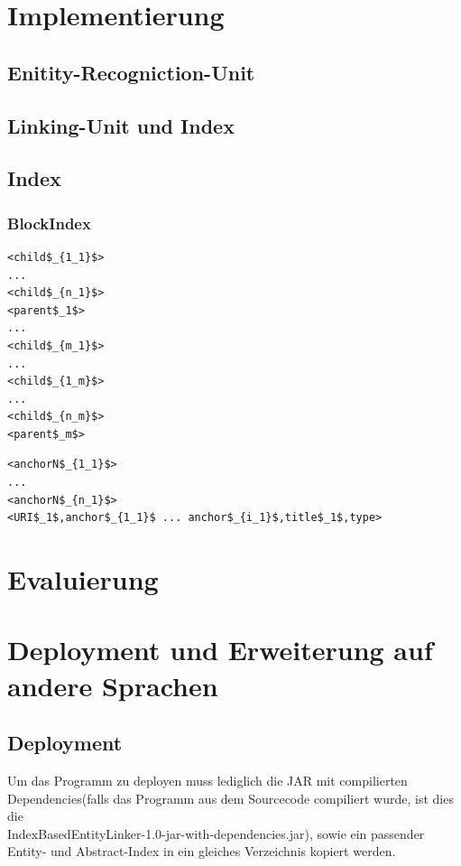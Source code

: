 \documentclass[11pt, a4paper, oneside]{Thesis} %
\begin{document}
\chapter{Implementierung}
\label{Kapitel 3}
\section{Enitity-Recogniction-Unit}
\section{Linking-Unit und Index}

\section{Index}
\subsection{BlockIndex}
\begin{lstlisting}
<child$_{1_1}$>
...
<child$_{n_1}$>
<parent$_1$>
...
<child$_{m_1}$>
...
<child$_{1_m}$>
...
<child$_{n_m}$>
<parent$_m$>
\end{lstlisting}
\begin{lstlisting}
<anchorN$_{1_1}$>
...
<anchorN$_{n_1}$>
<URI$_1$,anchor$_{1_1}$ ... anchor$_{i_1}$,title$_1$,type>
\end{lstlisting}
\chapter{Evaluierung}
\label{Kapitel 4}

\chapter{Deployment und Erweiterung auf andere Sprachen}
\label{Kapitel 5} %

\section{Deployment}
Um das Programm zu deployen muss lediglich die JAR mit compilierten Dependencies(falls das Programm aus dem Sourcecode compiliert wurde, ist dies die \\\glqq IndexBasedEntityLinker-1.0-jar-with-dependencies.jar\grqq), sowie ein passender Entity- und Abstract-Index in ein gleiches Verzeichnis kopiert werden.
\end{document}

